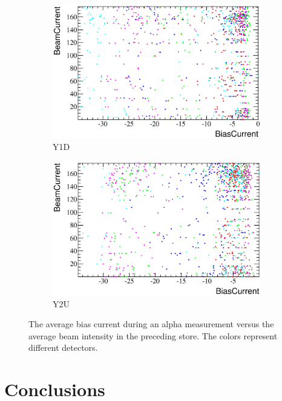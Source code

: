 \documentclass[a4paper,12pt]{article}
\begin{document}
\begin{figure}[p]
\begin{subfigure}[t]{0.5\textwidth}
\includegraphics[width=\textwidth]{gfx/run13_alpha_study/Y1D/c_hBiasCurrent_BeamCurrent.eps}
\caption{Y1D}
\end{subfigure}
%
\begin{subfigure}[t]{0.5\textwidth}
\includegraphics[width=\textwidth]{gfx/run13_alpha_study/Y2U/c_hBiasCurrent_BeamCurrent.eps}
\caption{Y2U}
\end{subfigure}
%
\caption{The average bias current during an alpha measurement versus the average
beam intensity in the preceding store. The colors represent different
detectors.}
\end{figure}


\section{Conclusions}
\end{document}
